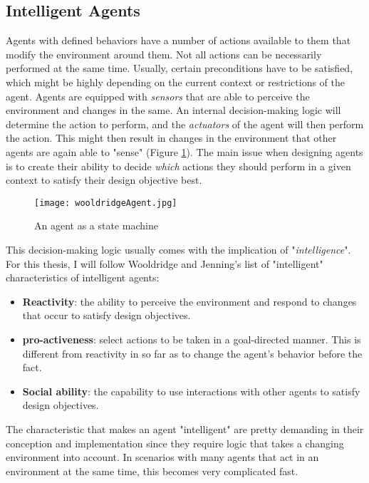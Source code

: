 \subsection{Intelligent Agents}
Agents with defined behaviors have a number of actions available to them that modify the environment around them. Not all actions can be necessarily performed at the same time. Usually, certain preconditions have to be satisfied, which might be highly depending on the current context or restrictions of the agent. Agents are equipped with \textit{sensors} that are able to perceive the environment and changes in the same. An internal decision-making logic will determine the action to perform, and the \textit{actuators} of the agent will then perform the action. This might then result in changes in the environment that other agents are again able to "sense" (Figure \ref{fig:wooldridgeAgent}). The main issue when designing agents is to create their ability to decide \textit{which} actions they should perform in a given context to satisfy their design objective best.~\cite{Wooldridge2009}\\
\begin{figure}
	\centering
	\texttt{[image: wooldridgeAgent.jpg]}
	\caption{An agent as a state machine~\cite{Wooldridge2009}}
	\label{fig:wooldridgeAgent}
\end{figure}
This decision-making logic usually comes with the implication of "\textit{intelligence}". For this thesis, I will follow Wooldridge and Jenning's list of "intelligent" characteristics of intelligent agents:
\begin{itemize}
	\item \textbf{Reactivity}: the ability to perceive the environment and respond to changes that occur to satisfy design objectives.
	\item \textbf{pro-activeness}: select actions to be taken in a goal-directed manner. This is different from reactivity in so far as to change the agent's behavior before the fact.
	\item \textbf{Social ability}: the capability to use interactions with other agents to satisfy design objectives.
\end{itemize}
The characteristic that makes an agent "intelligent" are pretty demanding in their conception and implementation since they require logic that takes a changing environment into account. In scenarios with many agents that act in an environment at the same time, this becomes very complicated fast.~\cite{Wooldridge1995}
